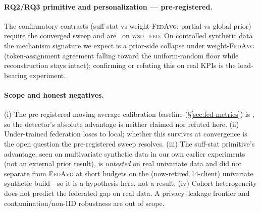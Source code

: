 \paragraph{RQ2/RQ3 primitive and personalization --- pre-registered.}
The confirmatory contrasts (suff-stat vs weight-\textsc{FedAvg}; partial vs global prior)
require the converged sweep and are \pending\ on \textsc{wsd\_fed}. On controlled synthetic
data the mechanism signature we expect is a prior-side collapse under weight-\textsc{FedAvg}
(token-assignment agreement falling toward the uniform-random floor while reconstruction
stays intact); confirming or refuting this on real KPIs is the load-bearing experiment.

\paragraph{Scope and honest negatives.}
(i) The pre-registered moving-average calibration baseline (\S\ref{sec:fed-metrics}) is
\pending, so the detector's absolute advantage is neither claimed nor refuted here. (ii) Under-trained federation loses to local; whether
this survives at convergence is the open question the pre-registered sweep resolves. (iii)
The suff-stat primitive's advantage, seen on multivariate synthetic data in our own earlier
experiments (not an external prior result), is \emph{untested} on real univariate data and did
not separate from \textsc{FedAvg} at short budgets on the (now-retired 14-client) univariate
synthetic build---so it is a hypothesis here, not a result. (iv) Cohort heterogeneity does
not predict the federated gap on real data. A privacy--leakage frontier and
contamination/non-IID robustness are out of scope.

